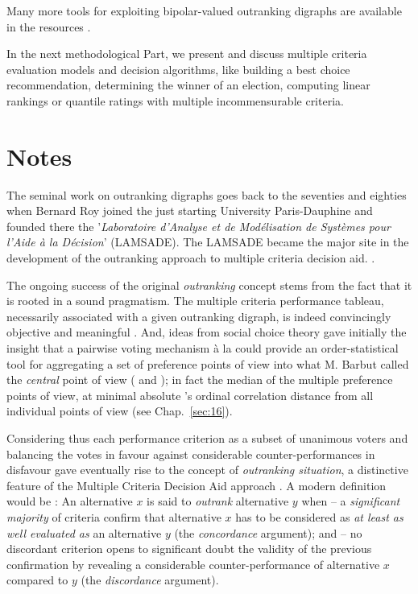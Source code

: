 Many more tools for exploiting bipolar-valued outranking digraphs are available in the \Digraph resources \citep{BIS-2021b}.

\vspace{\baselineskip}
In the next methodological Part, we present and discuss multiple criteria evaluation models and decision algorithms, like building a best choice recommendation, determining the winner of an election, computing linear rankings or quantile ratings with multiple incommensurable criteria.

{}
\section*{Notes}

The seminal work on outranking digraphs goes back to the seventies and eighties when Bernard Roy  joined the just starting University Paris-Dauphine and founded there the '\emph{Laboratoire d’Analyse et de Modélisation de Systèmes pour l’Aide à la Décision}' (LAMSADE). The LAMSADE became the major site in the development of the outranking approach to multiple criteria decision aid. \citep*{ROY-1993}.

The ongoing success of the original \emph{outranking} concept stems from the fact that it is rooted in a sound pragmatism. The multiple criteria performance tableau, necessarily associated with a given outranking digraph, is indeed convincingly objective and meaningful \citep{ROY-1991}. And, ideas from social choice theory gave initially the insight that a pairwise voting mechanism à la \Condorcet could provide an order-statistical tool for aggregating a set of preference points of view into what M. Barbut called the \emph{central} \Condorcet point of view (\citealp{CON-1784} and \citealp{BAR-1980}); in fact the median of the multiple preference points of view, at minimal absolute \Kendall's ordinal correlation distance from all individual points of view (see Chap.~\ref{sec:16}).

Considering thus each performance criterion as a subset of unanimous voters and balancing the votes in favour against considerable counter-performances in disfavour gave eventually rise to the concept of \emph{outranking situation}, a distinctive feature of the Multiple Criteria Decision Aid approach \citep{BIS-2015}.  A modern definition would be : An alternative $x$ is said to \emph{outrank} alternative $y$ when – a \emph{significant majority} of criteria confirm that alternative $x$ has to be considered as \emph{at least as well evaluated as} an alternative $y$ (the \emph{concordance} argument); and – no discordant criterion opens to significant doubt the validity of the previous confirmation by revealing a considerable counter-performance of alternative $x$ compared to $y$ (the \emph{discordance} argument).

